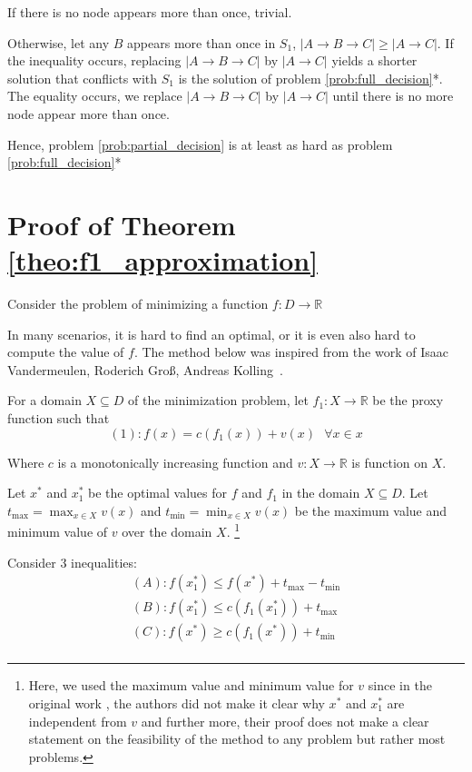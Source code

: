 If there is no node appears more than once, trivial.

Otherwise, let any $B$ appears more than once in $S_1$, $|A \to B \to C| \geq |A \to C|$. If the inequality occurs, replacing $|A \to B \to C|$ by $|A \to C|$ yields a shorter solution that conflicts with $S_1$ is the solution of problem \ref{prob:full_decision}*. The equality occurs, we replace $|A \to B \to C|$ by $|A \to C|$ until there is no more node appear more than once.

Hence, problem \ref{prob:partial_decision} is at least as hard as problem \ref{prob:full_decision}*

\section{Proof of Theorem \ref{theo:f1_approximation}}

Consider the problem of minimizing a function $f: D \to \mathbb{R}$

In many scenarios, it is hard to find an optimal, or it is even also hard to compute the value of $f$.
The method below was inspired from the work of Isaac Vandermeulen, Roderich Groß, Andreas Kolling~\cite{vandermeulen2019balanced}.

For a domain $X \subseteq D$ of the minimization problem,  let $f_1: X \to \mathbb{R}$ be the proxy function such that
\[
    (1): f(x) = c(f_1(x)) + v(x) \text{ } \forall x \in x
\]

Where $c$ is a monotonically increasing function and $v: X \to \mathbb{R}$ is function on $X$.

Let $x^*$ and $x^*_1$ be the optimal values for $f$ and $f_1$ in the domain $X \subseteq D$.
Let $t_{\max} = \max_{x \in X} v(x)$ and $t_{\min} = \min_{x \in X} v(x)$ be the maximum value and minimum value of $v$ over the domain $X$.  \footnote{Here, we used the maximum value and minimum value for $v$ since in the original work \cite{vandermeulen2019balanced}, the authors did not make it clear why $x^*$ and $x^*_1$ are independent from $v$ and further more, their proof does not make a clear statement on the feasibility of the method to any problem but rather most problems.}

Consider 3 inequalities:
\begin{gather*}
    (A): f(x^*_1) \leq f(x^*) + t_{\max} - t_{\min}\\
    (B): f(x^*_1) \leq c(f_1(x^*_1)) + t_{\max}\\
    (C): f(x^*) \geq c(f_1(x^*)) + t_{\min}\\
\end{gather*}

